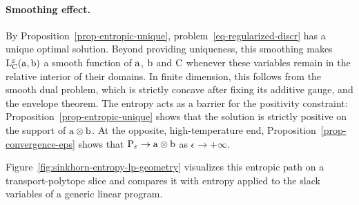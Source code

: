 \paragraph{Smoothing effect.}

By Proposition~\ref{prop-entropic-unique}, problem~\eqref{eq-regularized-discr} has a unique optimal solution.
%
Beyond providing uniqueness, this smoothing makes $\mathrm{L}_{\mathrm{C}}^\varepsilon(\mathrm{a},\mathrm{b})$ a smooth function of $\mathrm{a}$, $\mathrm{b}$ and $\mathrm{C}$ whenever these variables remain in the relative interior of their domains. In finite dimension, this follows from the smooth dual problem, which is strictly concave after fixing its additive gauge, and the envelope theorem.
%
The entropy acts as a barrier for the positivity constraint: Proposition~\ref{prop-entropic-unique} shows that the solution is strictly positive on the support of $\mathrm{a}\otimes\mathrm{b}$. At the opposite, high-temperature end, Proposition~\ref{prop-convergence-eps} shows that $\mathrm{P}_\varepsilon\to\mathrm{a}\otimes\mathrm{b}$ as $\epsilon\to+\infty$.

Figure~\ref{fig:sinkhorn-entropy-lp-geometry} visualizes this entropic path on a transport-polytope slice and compares it with entropy applied to the slack variables of a generic linear program.

